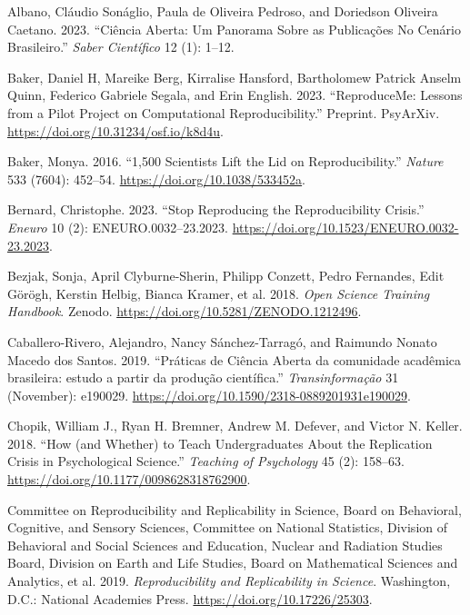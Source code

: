 \documentclass[
  a4paper,
]{article}
\newlength{\cslhangindent}
\newenvironment{CSLReferences}[2] %
 {\begin{list}{}{%
  \setlength{\itemindent}{0pt}
  \setlength{\leftmargin}{0pt}
  \setlength{\parsep}{0pt}
  \ifodd #1
   \setlength{\leftmargin}{\cslhangindent}
   \setlength{\itemindent}{-1\cslhangindent}
  \fi
  \setlength{\itemsep}{#2\baselineskip}}}
 {\end{list}}
\begin{document}
\label{refs}
\begin{CSLReferences}{1}{0}
Albano, Cláudio Sonáglio, Paula de Oliveira Pedroso, and Doriedson
Oliveira Caetano. 2023. {``Ci{ê}ncia {Aberta}: {Um Panorama} Sobre as
{Publica{ç}{õ}es} No {Cen{á}rio Brasileiro}.''} \emph{Saber
Cient{í}fico} 12 (1): 1--12.

Baker, Daniel H, Mareike Berg, Kirralise Hansford, Bartholomew Patrick
Anselm Quinn, Federico Gabriele Segala, and Erin English. 2023.
{``{ReproduceMe}: Lessons from a Pilot Project on Computational
Reproducibility.''} Preprint. PsyArXiv.
\url{https://doi.org/10.31234/osf.io/k8d4u}.

Baker, Monya. 2016. {``1,500 Scientists Lift the Lid on
Reproducibility.''} \emph{Nature} 533 (7604): 452--54.
\url{https://doi.org/10.1038/533452a}.

Bernard, Christophe. 2023. {``Stop {Reproducing} the {Reproducibility
Crisis}.''} \emph{Eneuro} 10 (2): ENEURO.0032--23.2023.
\url{https://doi.org/10.1523/ENEURO.0032-23.2023}.

Bezjak, Sonja, April Clyburne-Sherin, Philipp Conzett, Pedro Fernandes,
Edit Görögh, Kerstin Helbig, Bianca Kramer, et al. 2018. \emph{Open
{Science Training Handbook}}. Zenodo.
\url{https://doi.org/10.5281/ZENODO.1212496}.

Caballero-Rivero, Alejandro, Nancy Sánchez-Tarragó, and Raimundo Nonato
Macedo dos Santos. 2019. {``{Pr{á}ticas de Ci{ê}ncia Aberta da
comunidade acad{ê}mica brasileira: estudo a partir da produ{ç}{ã}o
cient{í}fica}.''} \emph{Transinforma{ç}{ã}o} 31 (November): e190029.
\url{https://doi.org/10.1590/2318-0889201931e190029}.

Chopik, William J., Ryan H. Bremner, Andrew M. Defever, and Victor N.
Keller. 2018. {``How (and {Whether}) to {Teach Undergraduates About} the
{Replication Crisis} in {Psychological Science}.''} \emph{Teaching of
Psychology} 45 (2): 158--63.
\url{https://doi.org/10.1177/0098628318762900}.

Committee on Reproducibility and Replicability in Science, Board on
Behavioral, Cognitive, and Sensory Sciences, Committee on National
Statistics, Division of Behavioral and Social Sciences and Education,
Nuclear and Radiation Studies Board, Division on Earth and Life Studies,
Board on Mathematical Sciences and Analytics, et al. 2019.
\emph{Reproducibility and {Replicability} in {Science}}. Washington,
D.C.: National Academies Press. \url{https://doi.org/10.17226/25303}.


\end{CSLReferences}
\end{document}
